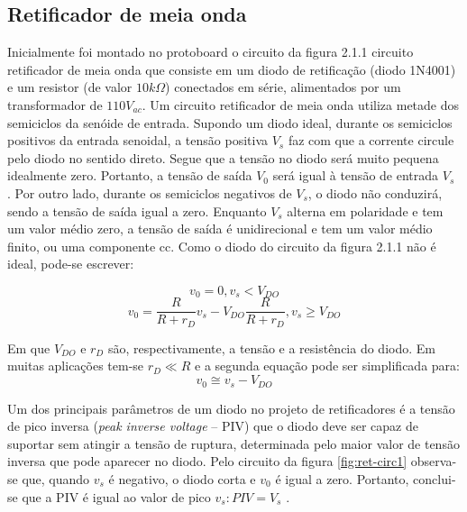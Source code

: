 \documentclass[a4paper]{article} %
\begin{document}
\subsection{Retificador de meia onda}
         Inicialmente foi montado no protoboard o circuito da figura 2.1.1 circuito retificador de meia onda que consiste em um diodo de retificação (diodo 1N4001) e um resistor (de valor $10k\Omega$) conectados em série, alimentados por um transformador de $110V_{ac}$.
         Um circuito retificador de meia onda utiliza metade dos semiciclos da senóide de entrada. Supondo um diodo ideal, durante os semiciclos positivos da entrada senoidal, a tensão positiva $V_s$ faz com que a corrente circule pelo diodo no sentido direto. Segue que a tensão no diodo será muito pequena idealmente zero. Portanto, a tensão de saída $V_0$ será igual à tensão de entrada $V_s$ . Por outro lado, durante os semiciclos negativos de $V_s$, o diodo não conduzirá, sendo a tensão de saída igual a zero. Enquanto $V_s$ alterna em polaridade e tem um valor médio zero, a tensão de saída é unidirecional e tem um valor médio finito, ou uma componente cc.
         Como o diodo do circuito da figura 2.1.1 não é ideal, pode-se escrever:
     
\begin{equation}
  v_0=0,       v_s<V_{DO}
\end{equation}
\begin{equation}
v_0=\frac{R}{R+r_D}v_s -V_{DO}\frac{R}{R+r_D},      v_s \geq V_{DO}
\end{equation}


    Em que   $V_{DO}$     e $r_D$ são, respectivamente, a tensão e a resistência do diodo.
         Em muitas aplicações tem-se  $r_D \ll R$           e a segunda equação pode ser simplificada para:
\begin{equation}
v_0 \cong v_s-V_{DO}
\end{equation}


         Um dos principais parâmetros de um diodo no projeto de retificadores é a tensão de pico inversa (\textit{peak inverse voltage} – PIV) que o diodo deve ser capaz de suportar sem atingir a
tensão de ruptura, determinada pelo maior valor de tensão inversa que pode aparecer no diodo. Pelo circuito da figura  \ref{fig:ret-circ1} observa-se que, quando $v_s$ é negativo, o diodo corta e   $v_0$      é
igual a zero. Portanto, conclui-se que a PIV é igual ao valor de pico $v_s:PIV=V_s$ .
\end{document}
